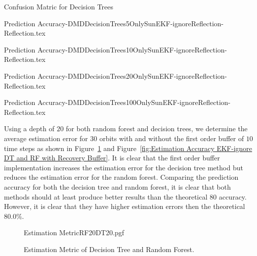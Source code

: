 \documentclass[letterpaper, 10 pt, conference]{ieeeconf}  %
\begin{document}
\begin{table}[h!tb]
	\caption{Confusion Matric for Decision Trees} 
	\label{Table: Prediction Accuracy-DMDDecisionTreesOnlySunEKF-ignoreReflection-Reflection} 
	\centering
	\begin{minipage}[c]{0.2\textwidth}
		{Prediction Accuracy-DMDDecisionTrees5OnlySunEKF-ignoreReflection-Reflection.tex}
	\end{minipage}
	\begin{minipage}[c]{0.2\textwidth}
		{Prediction Accuracy-DMDDecisionTrees10OnlySunEKF-ignoreReflection-Reflection.tex}
	\end{minipage}
	\begin{minipage}[c]{0.2\textwidth}
		{Prediction Accuracy-DMDDecisionTrees20OnlySunEKF-ignoreReflection-Reflection.tex}
	\end{minipage}
	\begin{minipage}[c]{0.2\textwidth}
		{Prediction Accuracy-DMDDecisionTrees100OnlySunEKF-ignoreReflection-Reflection.tex}
	\end{minipage}
\end{table}

Using a depth of $20$ for both random forest and decision trees, we determine the average estimation error for $30$ orbits with and without the first order buffer of $10$ time steps as shown in Figure~\ref{fig:Estimation Accuracy EKF-ignore DT and RF} and Figure~\ref{fig:Estimation Accuracy EKF-ignore DT and RF with Recovery Buffer}. It is clear that the first order buffer implementation increases the estimation error for the decision tree method but reduces the estimation error for the random forest. Comparing the prediction accuracy for both the decision tree and random forest, it is clear that both methods should at least produce better results than the theoretical $80$ accuracy. However, it is clear that they have higher estimation errors then the theoretical $80.0\%$. 

\begin{figure}[!htb]
	\begin{center}
		{Estimation MetricRF20DT20.pgf}
	\end{center}
	\caption[Estimation Metric of Decision Tree and Random Forest]{Estimation Metric of Decision Tree and Random Forest.}
	\label{fig:Estimation Accuracy EKF-ignore DT and RF}
\end{figure}
\end{document}
